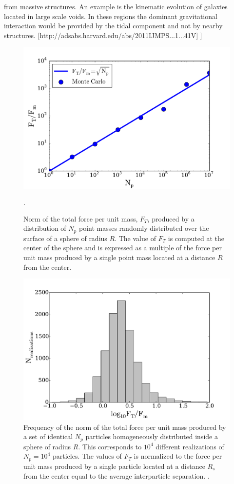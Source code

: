 \documentclass{article}
\begin{document}
from massive structures. An example is the kinematic evolution of
galaxies located in large scale voids. In these regions the dominant
gravitational interaction would be provided by the tidal component and
not by nearby structures. [http://adsabs.harvard.edu/abs/2011IJMPS...1...41V] ]


\begin{figure}
\begin{center}
\includegraphics[width=0.80\linewidth,angle=0]{spheres_surface.pdf}
\caption{Norm of the total force per unit mass, $F_{T}$, produced by a
  distribution of $N_p$ point masses randomly distributed over the
  surface of a sphere of radius $R$. The value
  of $F_T$ is  computed at the center of the sphere and is  expressed
  as a multiple  of the force per unit mass produced by a  single
  point mass located  at a distance $R$ from the
  center. \label{fig:sphere_surface}}. 
\end{center}
\end{figure}


\begin{figure}
\begin{center}
\includegraphics[width=0.8\linewidth,angle=0]{spheres_bulk.pdf}
\caption{\label{fig:sphere_bulk} Frequency of the norm of the total
  force per unit mass produced by a set of identical $N_p$ particles
  homogeneously distributed inside a sphere of radius $R$. This
  corresponds to $10^4$ different realizations of $N_p=10^4$
  particles. The values of $F_T$ is normalized to the force per unit
  mass produced by a single particle located at a distance $R_s$ from
  the center equal to the average interparticle
  separation. \label{fig:sphere_surface}.}  
\end{center}
\end{figure}
\end{document}
